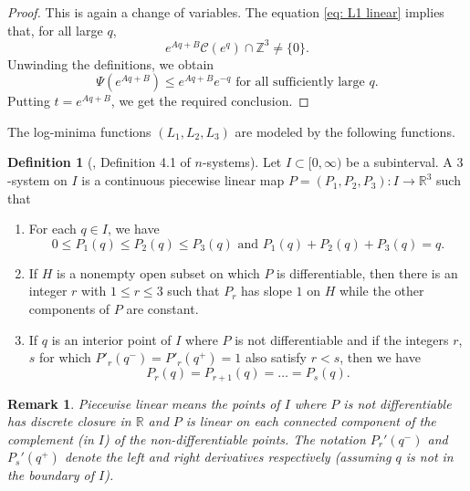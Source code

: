\documentclass[reqno,11pt, twoside]{amsart}
\theoremstyle{plain}
\newtheorem{rem}[thm]{Remark}
\theoremstyle{definition}
\newtheorem{defn}[thm]{Definition}
\theoremstyle{definition}
\theoremstyle{remark}
\numberwithin{equation}{section}
\newcommand{\R}{{\mathbb{R}}}
\newcommand{\Z}{{\mathbb{Z}}}
\begin{document}
\begin{proof}
    This is again a change of variables. The equation \eqref{eq: L1 linear} implies that, for all large $q$,
    \begin{equation*}
        e^{Aq + B} \mathcal{C}(e^q) \cap \Z^3 \neq \{0\}.
    \end{equation*}
    Unwinding the definitions, we obtain
    \begin{equation*}
        \Psi(e^{Aq+B}) \leq e^{Aq +B} e^{-q} \text{ for all sufficiently large } q.
    \end{equation*}
    Putting $t = e^{Aq+B}$, we get the required conclusion.
\end{proof}
The log-minima functions $(L_1,L_2,L_3)$ are modeled by the following functions.
\begin{defn}[\cite{Roy-MathZ}, Definition 4.1 of $n$-systems]\label{defn: 3-system}
    Let $I \subset [0,\infty)$ be a subinterval. A $3$-system on $I$ is a continuous piecewise linear map $P=(P_1,P_2,P_3):I \to \R^3$ such that 
    \begin{enumerate}
        \item[(S1)] For each $q \in I$, we have
        \begin{equation*}
            0 \leq P_1(q) \leq P_2(q) \leq P_3(q) \text{ and } P_1(q) + P_2(q) + P_3(q) = q.
        \end{equation*}
        \item[(S2)] If $H$ is a nonempty open subset on which $P$ is differentiable, then there is an integer $r$ with $1\leq r \leq 3$ such that $P_r$ has slope $1$ on $H$ while the other components of $P$ are constant.
        \item[(S3)] If $q$ is an interior point of $I$ where $P$ is not differentiable and if the integers $r$, $s$ for which $P'_r(q^-) = P'_r(q^+)=1$ also satisfy $r < s$, then we have
        \begin{equation*}
            P_r(q) = P_{r+1}(q) = \dots = P_s(q).
        \end{equation*}
    \end{enumerate}
\end{defn}
\begin{rem}
    Piecewise linear means the points of $I$ where $P$ is not differentiable has discrete closure in $\R$ and $P$ is linear on each connected component of the complement (in $I$) of the non-differentiable points. The notation $P_r'(q^-)$ and $P_s'(q^+)$ denote the left and right derivatives respectively (assuming $q$ is not in the boundary of $I$).
\end{rem}
\end{document}
